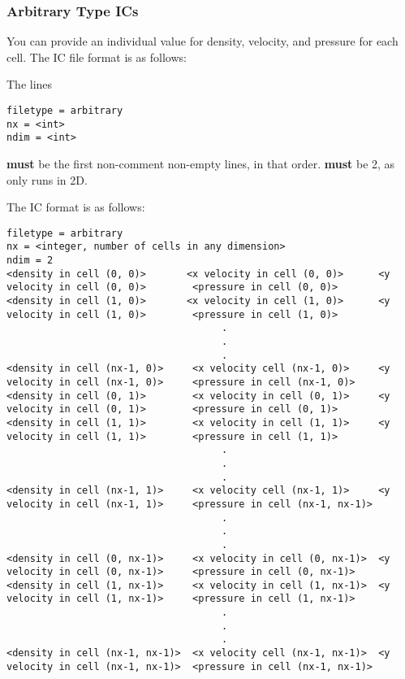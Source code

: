 \subsubsection{Arbitrary Type ICs}\label{chap:arbitrary-ic}




You can provide an individual value for density, velocity, and pressure for each
cell. The IC file format is as follows:

The lines

\begin{lstlisting}
filetype = arbitrary
nx = <int>
ndim = <int>
\end{lstlisting}

\textbf{must} be the first non-comment non-empty lines, in that order.
 \textbf{must} be 2, as \hydro only runs
in 2D.

The IC format is as follows:

\begin{lstlisting}
filetype = arbitrary
nx = <integer, number of cells in any dimension>
ndim = 2
<density in cell (0, 0)>       <x velocity in cell (0, 0)>      <y velocity in cell (0, 0)>        <pressure in cell (0, 0)>
<density in cell (1, 0)>       <x velocity in cell (1, 0)>      <y velocity in cell (1, 0)>        <pressure in cell (1, 0)>
                                     .
                                     .
                                     .
<density in cell (nx-1, 0)>     <x velocity cell (nx-1, 0)>     <y velocity in cell (nx-1, 0)>     <pressure in cell (nx-1, 0)>
<density in cell (0, 1)>        <x velocity in cell (0, 1)>     <y velocity in cell (0, 1)>        <pressure in cell (0, 1)>
<density in cell (1, 1)>        <x velocity in cell (1, 1)>     <y velocity in cell (1, 1)>        <pressure in cell (1, 1)>
                                     .
                                     .
                                     .
<density in cell (nx-1, 1)>     <x velocity cell (nx-1, 1)>     <y velocity in cell (nx-1, 1)>     <pressure in cell (nx-1, nx-1)>
                                     .
                                     .
                                     .
<density in cell (0, nx-1)>     <x velocity in cell (0, nx-1)>  <y velocity in cell (0, nx-1)>     <pressure in cell (0, nx-1)>
<density in cell (1, nx-1)>     <x velocity in cell (1, nx-1)>  <y velocity in cell (1, nx-1)>     <pressure in cell (1, nx-1)>
                                     .
                                     .
                                     .
<density in cell (nx-1, nx-1)>  <x velocity cell (nx-1, nx-1)>  <y velocity in cell (nx-1, nx-1)>  <pressure in cell (nx-1, nx-1)>
\end{lstlisting}

